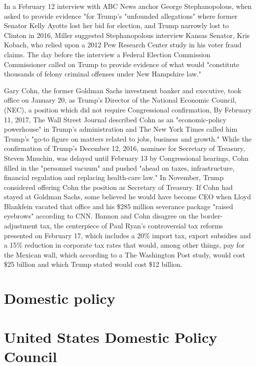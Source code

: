 In a February 12 interview with ABC News anchor George Stephanopolous,
when asked to provide evidence "for Trump's "unfounded allegations"
where former Senator Kelly Ayotte lost her bid for election, and Trump
narrowly lost to Clinton in 2016, Miller suggested Stephanopolous
interview Kansas Senator, Kris Kobach, who relied upon a 2012 Pew
Research Center study in his voter fraud claims. The day before the
interview a Federal Election Commission Commissioner called on Trump to
provide evidence of what would "constitute thousands of felony criminal
offenses under New Hampshire law."

Gary Cohn, the former Goldman Sachs investment banker and executive,
took office on January 20, as Trump's Director of the National Economic
Council, (NEC), a position which did not require Congressional
confirmation, By February 11, 2017, The Wall Street Journal described
Cohn as an "economic-policy powerhouse" in Trump's administration and
The New York Times called him Trump's "go-to figure on matters related
to jobs, business and growth." While the confirmation of Trump's
December 12, 2016, nominee for Secretary of Treasury, Steven Mnuchin,
was delayed until February 13 by Congressional hearings, Cohn filled in
the "personnel vacuum" and pushed "ahead on taxes, infrastructure,
financial regulation and replacing health-care law." In November, Trump
considered offering Cohn the position as Secretary of Treasury. If Cohn
had stayed at Goldman Sachs, some believed he would have become CEO when
Lloyd Blankfein vacated that office and his \$285 million severance
package "raised eyebrows" according to CNN. Bannon and Cohn disagree on
the border-adjustment tax, the centerpiece of Paul Ryan's controversial
tax reforms presented on February 17, which includes a 20\% import tax,
export subsidies and a 15\% reduction in corporate tax rates that would,
among other things, pay for the Mexican wall, which according to a The
Washington Post study, would cost \$25 billion and which Trump stated
would cost \$12 billion.

\section{Domestic policy}\label{domestic-policy}

\section{United States Domestic Policy
Council}\label{united-states-domestic-policy-council}

